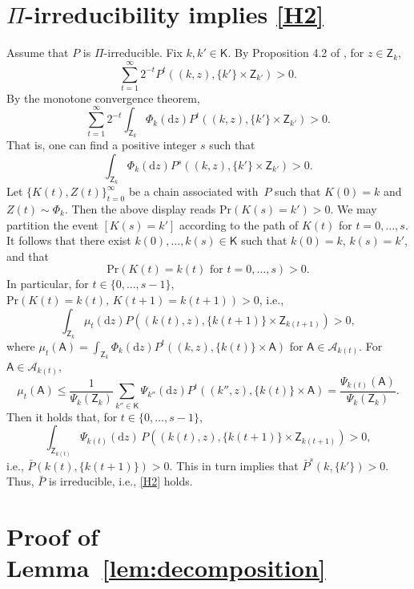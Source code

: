 \documentclass[12pt]{article}
\newcommand{\df}{\mathrm{d}}
\newcommand{\Z}{\mathsf{Z}}
\newcommand{\A}{\mathcal{A}}
\begin{document}

\section{$\Pi$-irreducibility implies \ref{H2}} \label{app:h2}

Assume that $P$ is $\Pi$-irreducible.
Fix $k, k' \in \mathsf{K}$.
By Proposition 4.2 of \cite{meyn2012markov}, for $z \in \Z_k$,
\[
\sum_{t=1}^{\infty} 2^{-t} P^t((k,z), \{k'\} \times \Z_{k'}) > 0.
\]
By the monotone convergence theorem, 
\[
\sum_{t=1}^{\infty} 2^{-t} \int_{\Z_k} \Phi_k(\df z) P^t((k,z), \{k'\} \times \Z_{k'}) > 0.
\]
That is, one can find a positive integer $s$ such that 
\[
\int_{\Z_k} \Phi_k(\df z) P^s((k,z), \{k'\} \times \Z_{k'}) > 0.
\]
Let $\{K(t), Z(t)\}_{t=0}^{\infty}$ be a chain associated with~$P$ such that $K(0) = k$ and $Z(t) \sim \Phi_k$.
Then the above display reads $\mbox{Pr}(K(s) = k') > 0$.
We may partition the event $[K(s) = k']$ according to the path of $K(t)$ for $t = 0,\dots,s$.
It follows that there exist $k(0), \dots, k(s) \in \mathsf{K}$ such that $k(0) = k$, $k(s) = k'$, and that
\[
\mbox{Pr} \left( K(t) = k(t) \text{ for } t = 0,\dots,s \right) > 0.
\] 
In particular, for $t \in \{0,\dots,s-1\}$, $\mbox{Pr}(K(t) = k(t), \, K(t+1) = k(t+1)) > 0$, i.e.,
\[
\int_{\Z_k} \mu_t(\df z) P((k(t),z), \{k(t+1)\} \times \Z_{k(t+1)} ) > 0,
\]
where $\mu_t(\mathsf{A}) = \int_{\Z_k} \Phi_k(\df z) P^t((k,z), \{k(t)\} \times \mathsf{A})$ for $\mathsf{A} \in \A_{k(t)}$.
For $\mathsf{A} \in \A_{k(t)}$,
\[
\mu_t(\mathsf{A}) \leq \frac{1}{\Psi_k(\Z_k)} \sum_{k'' \in \mathsf{K}} \Psi_{k''}(\df z) P^t((k'',z), \{k(t)\} \times \mathsf{A}) = \frac{\Psi_{k(t)}(\mathsf{A})}{\Psi_k(\Z_k)}.
\]
Then it holds that, for $t \in \{0,\dots,s-1\}$,
\[
\int_{\Z_{k(t)}} \Psi_{k(t)}(\df z) \, P((k(t),z), \{k(t+1)\} \times \Z_{k(t+1)} ) > 0,
\]
i.e., $\bar{P}(k(t), \{k(t+1)\}) > 0$.
This in turn implies that $\bar{P}^s(k,\{k'\}) > 0$.
Thus, $\bar{P}$ is irreducible, i.e., \ref{H2} holds.


\section{Proof of Lemma~\ref{lem:decomposition}} \label{app:decomposition}
\end{document}

